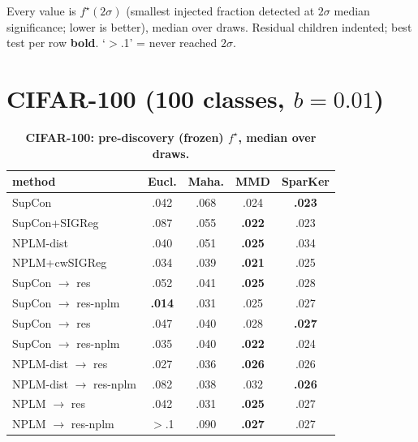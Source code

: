 \documentclass[10pt]{article}
\begin{document}
Every value is $f^\star(2\sigma)$ (smallest injected fraction detected at $2\sigma$ median significance; lower is better), median over draws. Residual children indented; best test per row \textbf{bold}. `$>$.1' = never reached $2\sigma$.
\clearpage\section*{CIFAR-100 (100 classes, $b{=}0.01$)}
\begin{table}[t]
\centering
\footnotesize

\begin{tabular}{lcccc}
\toprule
method & Eucl. & Maha. & MMD & SparKer \\
\midrule
SupCon & .042 & .068 & .024 & \textbf{.023} \\
SupCon+SIGReg & .087 & .055 & \textbf{.022} & .023 \\
NPLM-dist & .040 & .051 & \textbf{.025} & .034 \\
NPLM+cwSIGReg & .034 & .039 & \textbf{.021} & .025 \\
\quad SupCon $\to$ res & .052 & .041 & \textbf{.025} & .028 \\
\quad SupCon $\to$ res-nplm & \textbf{.014} & .031 & .025 & .027 \\
\quad SupCon $\to$ res & .047 & .040 & .028 & \textbf{.027} \\
\quad SupCon $\to$ res-nplm & .035 & .040 & \textbf{.022} & .024 \\
\quad NPLM-dist $\to$ res & .027 & .036 & \textbf{.026} & .026 \\
\quad NPLM-dist $\to$ res-nplm & .082 & .038 & .032 & \textbf{.026} \\
\quad NPLM $\to$ res & .042 & .031 & \textbf{.025} & .027 \\
\quad NPLM $\to$ res-nplm & $>$.1 & .090 & \textbf{.027} & .027 \\
\bottomrule
\end{tabular}

\caption{\textbf{CIFAR-100: pre-discovery (frozen) $f^\star$, median over draws.}}
\label{tab:CIFAR-100pre}
\end{table}
\end{document}
